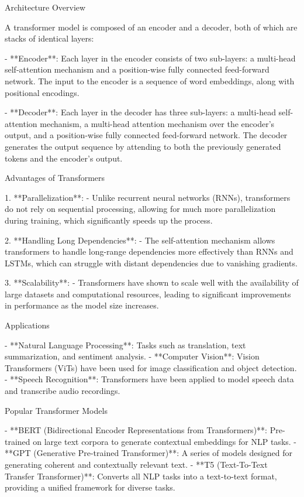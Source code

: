 Architecture Overview

A transformer model is composed of an encoder and a decoder, both of which are stacks of identical layers:

- **Encoder**: Each layer in the encoder consists of two sub-layers: a multi-head self-attention mechanism and a position-wise fully connected feed-forward network. The input to the encoder is a sequence of word embeddings, along with positional encodings.
  
- **Decoder**: Each layer in the decoder has three sub-layers: a multi-head self-attention mechanism, a multi-head attention mechanism over the encoder's output, and a position-wise fully connected feed-forward network. The decoder generates the output sequence by attending to both the previously generated tokens and the encoder's output.

 Advantages of Transformers

1. **Parallelization**:
   - Unlike recurrent neural networks (RNNs), transformers do not rely on sequential processing, allowing for much more parallelization during training, which significantly speeds up the process.

2. **Handling Long Dependencies**:
   - The self-attention mechanism allows transformers to handle long-range dependencies more effectively than RNNs and LSTMs, which can struggle with distant dependencies due to vanishing gradients.

3. **Scalability**:
   - Transformers have shown to scale well with the availability of large datasets and computational resources, leading to significant improvements in performance as the model size increases.

 Applications

- **Natural Language Processing**: Tasks such as translation, text summarization, and sentiment analysis.
- **Computer Vision**: Vision Transformers (ViTs) have been used for image classification and object detection.
- **Speech Recognition**: Transformers have been applied to model speech data and transcribe audio recordings.

 Popular Transformer Models

- **BERT (Bidirectional Encoder Representations from Transformers)**: Pre-trained on large text corpora to generate contextual embeddings for NLP tasks.
- **GPT (Generative Pre-trained Transformer)**: A series of models designed for generating coherent and contextually relevant text.
- **T5 (Text-To-Text Transfer Transformer)**: Converts all NLP tasks into a text-to-text format, providing a unified framework for diverse tasks.

